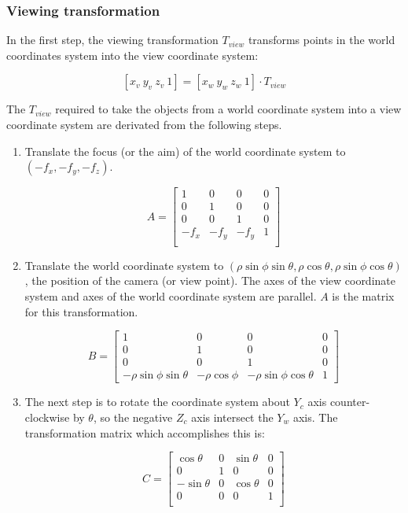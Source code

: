 \subsubsection{Viewing transformation}

In the first step, the viewing transformation $T_{view}$ transforms
points in the world coordinates system into the view coordinate
system:

  \[ [x_v \  y_v \  z_v \  1] = [x_w \  y_w \  z_w \  1] \cdot T_{view}   \]

The $T_{view}$ required to take the objects from a world coordinate
system into a view coordinate system are derivated from the following
steps.

\begin{enumerate}
	\item Translate the focus (or the aim) of the world coordinate
		system to $(-f_x, -f_y, -f_z)$.

		\[ A = \left[  \begin{array}{cccc}
					1 & 0 & 0 & 0 \\
					0 & 1 & 0 & 0 \\
					0 & 0 & 1 & 0 \\
					-f_x & -f_y & -f_y & 1 \\
					\end{array}
			  \right] \]

	\item Translate the world coordinate system to 
		$(\rho\sin\phi\sin\theta, \rho\cos\theta, \rho\sin\phi\cos\theta)$,
		the position of the camera (or view point).  The axes of the
		view coordinate system and axes of the world coordinate
		system are parallel.  $A$ is the matrix for this
		transformation.

		\[ B = \left[  \begin{array}{cccc}
					1 & 0 & 0 & 0 \\
					0 & 1 & 0 & 0 \\
					0 & 0 & 1 & 0 \\
					-\rho\sin\phi\sin\theta & -\rho\cos\phi & 
					-\rho\sin\phi\cos\theta & 1
					\end{array}
			  \right] \]

	\item The next step is to rotate the coordinate system
		about $Y_c$ axis counter-clockwise by $\theta$, so the 
		negative $Z_c$ axis intersect the $Y_w$ axis.  The
		transformation matrix which accomplishes this is:

		\[ C = \left[  \begin{array}{cccc}
					\cos\theta & 0 & \sin\theta & 0 \\
					0 & 1 & 0 & 0 \\
					-\sin\theta & 0 & \cos\theta & 0 \\
					0 & 0 & 0 & 1 \\
					\end{array}
			  \right] \]


\end{enumerate}
